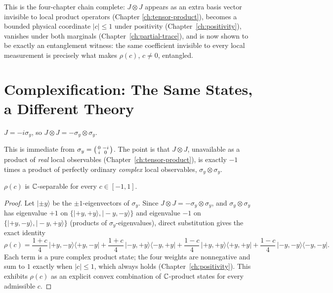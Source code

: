This is the four-chapter chain complete: $J\otimes J$ appears as an extra
basis vector invisible to local product operators (Chapter
\ref{ch:tensor-product}), becomes a bounded physical coordinate $|c|\le1$
under positivity (Chapter~\ref{ch:positivity}), vanishes under both
marginals (Chapter~\ref{ch:partial-trace}), and is now shown to be exactly an
entanglement witness: the same coefficient invisible to every local
measurement is precisely what makes $\rho(c)$, $c\ne0$, entangled.

\section{Complexification: The Same States, a Different Theory}

\begin{proposition}
\label{prop:JJ-is-sigmay}
$J = -i\sigma_y$, so $J\otimes J = -\sigma_y\otimes\sigma_y$.
\end{proposition}

This is immediate from $\sigma_y = \begin{psmallmatrix}0&-i\\i&0
\end{psmallmatrix}$. The point is that $J\otimes J$, unavailable as a product
of \emph{real} local observables (Chapter~\ref{ch:tensor-product}), is
exactly $-1$ times a product of perfectly ordinary \emph{complex} local
observables, $\sigma_y\otimes\sigma_y$.

\begin{theorem}
\label{thm:complex-separable}
$\rho(c)$ is $\mathbb{C}$-separable for every $c\in[-1,1]$.
\end{theorem}

\begin{proof}
Let $|{\pm}y\rangle$ be the $\pm1$-eigenvectors of $\sigma_y$. Since $J\otimes
J = -\sigma_y\otimes\sigma_y$, and $\sigma_y\otimes\sigma_y$ has eigenvalue
$+1$ on $\{|{+}y,{+}y\rangle,|{-}y,{-}y\rangle\}$ and eigenvalue $-1$ on
$\{|{+}y,{-}y\rangle,|{-}y,{+}y\rangle\}$ (products of $\sigma_y$-eigenvalues),
direct substitution gives the exact identity
\begin{equation}
\rho(c) = \frac{1+c}{4}\,|{+}y,{-}y\rangle\langle{+}y,{-}y| +
\frac{1+c}{4}\,|{-}y,{+}y\rangle\langle{-}y,{+}y| +
\frac{1-c}{4}\,|{+}y,{+}y\rangle\langle{+}y,{+}y| +
\frac{1-c}{4}\,|{-}y,{-}y\rangle\langle{-}y,{-}y|.
\end{equation}
Each term is a pure complex product state; the four weights are nonnegative
and sum to $1$ exactly when $|c|\le1$, which always holds
(Chapter~\ref{ch:positivity}). This exhibits $\rho(c)$ as an explicit convex
combination of $\mathbb{C}$-product states for every admissible $c$.
\end{proof}

